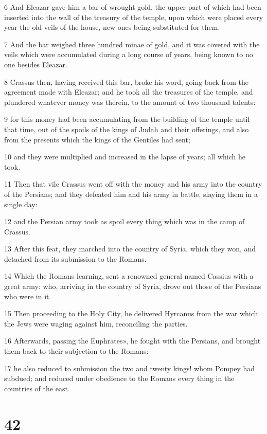6 And Eleazar gave him a bar of wrought gold, the upper part of which had been inserted into the wall of the treasury of the temple, upon which were placed every year the old veils of the house, new ones being substituted for them. 

7 And the bar weighed three hundred minae of gold, and it was covered with the veils which were accumulated during a long course of years, being known to no one besides Eleazar. 

8 Crassus then, having received this bar, broke his word, going back from the agreement made with Eleazar; and he took all the treasures of the temple, and plundered whatever money was therein, to the amount of two thousand talents: 

9 for this money had been accumulating from the building of the temple until that time, out of the spoils of the kings of Judah and their offerings, and also from the presents which the kings of the Gentiles had sent; 

10 and they were multiplied and increased in the lapse of years; all which he took. 

11 Then that vile Crassus went off with the money and his army into the country of the Persians; and they defeated him and his army in battle, slaying them in a single day: 

12 and the Persian army took as spoil every thing which was in the camp of Crassus. 

13 After this feat, they marched into the country of Syria, which they won, and detached from its submission to the Romans. 

14 Which the Romans learning, sent a renowned general named Cassius with a great army: who, arriving in the country of Syria, drove out those of the Persians who were in it. 

15 Then proceeding to the Holy City, he delivered Hyrcanus from the war which the Jews were waging against him, reconciling the parties. 

16 Afterwards, passing the Euphrates», he fought with the Persians, and brought them back to their subjection to the Romans: 

17 he also reduced to submission the two and twenty kings! whom Pompey had subdued; and reduced under obedience to the Romans every thing in the countries of the east. 

\chapter{42}

